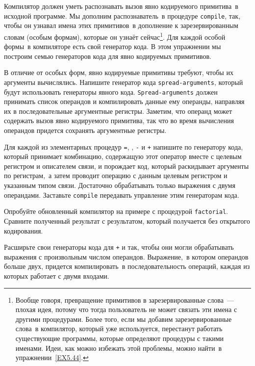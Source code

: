 \begin{exercise}{5.38}
Компилятор должен уметь распознавать вызов явно
кодируемого примитива~в исходной программе.  Мы дополним
распознаватель~в процедуре {\tt compile}, так, чтобы он узнавал имена
этих примитивов~в дополнение к 
зарезервированным словам (особым
формам), которые он узнаёт сейчас\footnote{Вообще говоря, превращение примитивов в
зарезервированные слова~--- плохая идея, потому что тогда пользователь
не может связать эти имена с другими процедурами.  Более того, если мы
добавим зарезервированные слова~в компилятор, который уже
используется, перестанут работать существующие программы, которые
определяют процедуры с такими именами.  Идеи, как можно избежать этой
проблемы, можно найти~в упражнении~\ref{EX5.44}.
}.
Для каждой особой формы~в компиляторе есть свой генератор кода.  В
этом упражнении мы построим семью генераторов кода для явно
кодируемых примитивов.

\begin{plainenum}


\item
В отличие от особых форм, явно кодируемые примитивы
требуют, чтобы их аргументы вычислялись.  Напишите генератор кода
{\tt spread-arguments}, который будут использовать генераторы
явного кода. {\tt Spread-arguments} должен принимать список
операндов и компилировать данные ему операнды, направляя их в
последовательные аргументные регистры.  Заметим, что операнд может
содержать вызов явно кодируемого примитива, так что во время
вычисления операндов придется сохранять аргументные регистры.

\item
Для каждой из элементарных процедур {\tt =},
{\tt *}, {\tt -} и {\tt +} напишите по
генератору кода, который принимает комбинацию, содержащую этот
оператор вместе с целевым регистром и описателем связи, и порождает
код, который раскидывает аргументы по регистрам,~а затем проводит
операцию с данным целевым регистром и указанным типом связи.
Достаточно обрабатывать только выражения с двумя операндами.
Заставьте {\tt compile} передавать управление этим генераторам
кода.

\item
Опробуйте обновленный компилятор на примере с
процедурой {\tt factorial}.  Сравните полученный результат с
результатом, который получается без открытого кодирования.

\item
Расширьте свои генераторы кода для {\tt +} и
{\tt *} так, чтобы они могли обрабатывать выражения с
произвольным числом операндов.  Выражение,~в котором операндов больше
двух, придется компилировать~в последовательность операций, каждая из
которых работает с двумя входами.
\end{plainenum}
\end{exercise}

